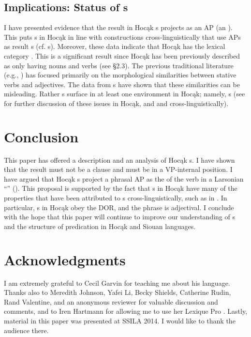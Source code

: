 \documentclass[output=paper]{LSP/langsci}
\begin{document}
\subsection{Implications: Status of s}

 
I have presented evidence that the result  in Hocąk s projects as an AP (an ). This puts s in Hocąk in line with  constructions cross-linguistically that use APs as result s (cf.  s). Moreover, these data indicate that Hocąk has the lexical category . This is a significant result since Hocąk has been previously described as only having nouns and verbs (see \S 2.3). The previous traditional literature (e.g., \citealt{Helmbrecht2006b}) has focused primarily on the morphological similarities between stative verbs and adjectives. The data from s have shown that these similarities can be misleading. Rather s surface in at least one environment in Hocąk; namely, s (see \citealt{Rosen2014,Rosen2015} for further discussion of these issues in Hocąk, and \citealt{Baker2003} and \citealt{Dixon2004} cross-linguistically).

\section{Conclusion}\label{sec:rosen:6}
This paper has offered a description and an analysis of Hocąk s. I have shown that the result  must not be a clause and must be in a VP-internal position. I have argued that Hocąk s project a phrasal AP as the  of the verb in a Larsonian ``'' (\citealt{Larson1988}). This proposal is supported by the fact that s in Hocąk have many of the properties that have been attributed to s cross-linguistically, such as in . In particular, s in Hocąk obey the DOR, and the  phrase is adjectival. I conclude with the hope that this paper will continue to improve our understanding of s and the structure of predication in Hocąk and Siouan languages.
 

\section* {Acknowledgments}
I am extremely grateful to Cecil Garvin for teaching me about his language. Thanks also to Meredith Johnson, Yafei Li, Becky Shields, Catherine Rudin, Rand Valentine, and an anonymous reviewer for valuable discussion and comments, and to Iren Hartmann for allowing me to use her Lexique Pro . Lastly, material in this paper was presented at SSILA 2014. I would like to thank the audience there.
\end{document}
